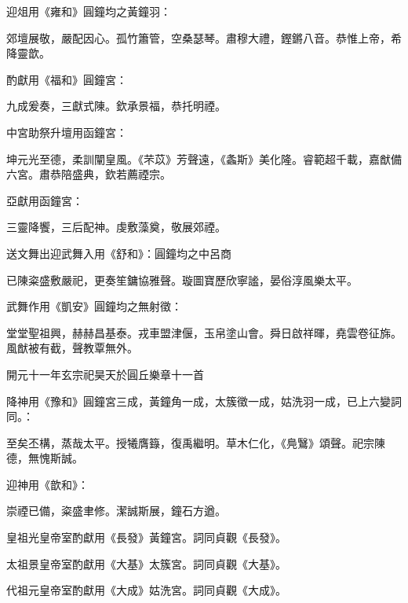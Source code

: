 \begin{pinyinscope}
 迎俎用《雍和》圓鐘均之黃鐘羽：



 郊壇展敬，嚴配因心。孤竹簫管，空桑瑟琴。肅穆大禮，鏗鏘八音。恭惟上帝，希降靈歆。



 酌獻用《福和》圓鐘宮：



 九成爰奏，三獻式陳。欽承景福，恭托明禋。



 中宮助祭升壇用函鐘宮：



 坤元光至德，柔訓闡皇風。《芣苡》芳聲遠，《螽斯》美化隆。睿範超千載，嘉猷備六宮。肅恭陪盛典，欽若薦禋宗。



 亞獻用函鐘宮：



 三靈降饗，三后配神。虔敷藻奠，敬展郊禋。



 送文舞出迎武舞入用《舒和》：圓鐘均之中呂商



 已陳粢盛敷嚴祀，更奏笙鏞協雅聲。璇圖寶歷欣寧謐，晏俗淳風樂太平。



 武舞作用《凱安》圓鐘均之無射徵：



 堂堂聖祖興，赫赫昌基泰。戎車盟津偃，玉帛塗山會。舜日啟祥暉，堯雲卷征旆。風猷被有截，聲教覃無外。



 開元十一年玄宗祀昊天於圓丘樂章十一首



 降神用《豫和》圓鐘宮三成，黃鐘角一成，太簇徵一成，姑洗羽一成，已上六變詞同。：



 至矣丕構，蒸哉太平。授犧膺籙，復禹繼明。草木仁化，《鳧鷖》頌聲。祀宗陳德，無愧斯誠。



 迎神用《歆和》：



 崇禋已備，粢盛聿修。潔誠斯展，鐘石方遒。



 皇祖光皇帝室酌獻用《長發》黃鐘宮。詞同貞觀《長發》。



 太祖景皇帝室酌獻用《大基》太簇宮。詞同貞觀《大基》。



 代祖元皇帝室酌獻用《大成》姑洗宮。詞同貞觀《大成》。




\end{pinyinscope}
